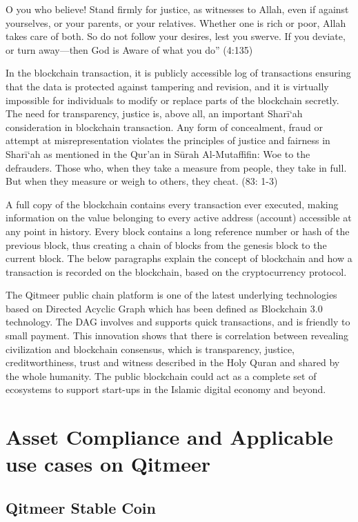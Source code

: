 \documentclass[a4paper,11pt]{article}
\begin{document}
O you who believe! Stand firmly for justice, as witnesses to Allah, even if against yourselves, or your parents, or your relatives. Whether one is rich or poor, Allah takes care of both. So do not follow your desires, lest you swerve. If you deviate, or turn away—then God is Aware of what you do” (4:135)

In the blockchain transaction, it is publicly accessible log of transactions ensuring that the data is protected against tampering and revision, and it is virtually impossible for individuals to modify or replace parts of the blockchain secretly. The need for transparency, justice is, above all, an important Sharī`ah consideration in blockchain transaction. Any form of concealment, fraud or attempt at misrepresentation violates the principles of justice and fairness in Sharī`ah as mentioned in the Qur’an in Sūrah Al-Mutaffifin: 
Woe to the defrauders. Those who, when they take a measure from people, they take in full. But when they measure or weigh to others, they cheat. (83: 1-3)

A full copy of the blockchain contains every transaction ever executed, making information on the value belonging to every active address (account) accessible at any point in history. Every block contains a long reference number or hash of the previous block, thus creating a chain of blocks from the genesis block to the current block. The below paragraphs explain the concept of blockchain and how a transaction is recorded on the blockchain, based on the cryptocurrency protocol.
 
The Qitmeer public chain platform is one of the latest underlying technologies based on Directed Acyclic Graph which has been defined as Blockchain 3.0 technology. The DAG involves and supports quick transactions, and is friendly to small payment. This innovation shows that there is correlation between revealing civilization and blockchain consensus, which is transparency, justice, creditworthiness, trust and witness described in the Holy Quran and shared by the whole humanity. The public blockchain could act as a complete set of ecosystems to support start-ups in the Islamic digital economy and beyond. 


\section{Asset Compliance and Applicable use cases on Qitmeer}

\subsection{Qitmeer Stable Coin}
\end{document}
